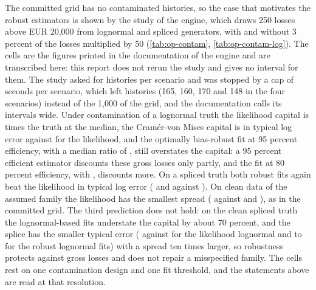 The committed grid has no contaminated histories, so the case that motivates the robust estimators is shown by the study of the engine, which draws 250 losses above EUR 20,000 from lognormal and spliced generators, with and
without 3 percent of the losses multiplied by 50 (\cref{tab:op-contam}, \cref{tab:op-contam-log}). The cells are the figures printed in the documentation of the engine and are transcribed here: this report does not rerun the study and gives no interval for them.
The study asked for \opContamRequested{} histories per scenario and was stopped by a cap of \opContamCap{} seconds per scenario, which left \opContamN{} histories (165, 160, 170 and 148 in the four scenarios) instead of the 1,000 of the grid, and the documentation calls
its intervals wide. Under contamination of a lognormal truth the likelihood capital is \opContamMleMedian{} times the truth at the median, the Cram\'er-von Mises capital
is \opContamGrossCvm{} in typical log error against \opContamGrossMle{} for the likelihood, and the optimally bias-robust fit at 95 percent efficiency, with a median ratio of \opContamObreMedian{}, still overstates the capital: a 95 percent efficient estimator discounts these gross losses only
partly, and the fit at 80 percent efficiency, with \opContamGrossObreEighty{}, discounts more. On a spliced truth both robust fits again beat the likelihood in typical log error (\opContamSplCvm{} and \opContamSplObre{} against \opContamSplMle{}). On clean data of the assumed family the likelihood has the smallest spread
(\opContamCleanIqrMle{} against \opContamCleanIqrObre{} and \opContamCleanIqrCvm{}), as in the committed grid. The third prediction does not hold: on the clean spliced truth the lognormal-based fits understate the capital by about 70 percent, and the splice has the smaller typical error
(\opContamSpliceErrSplice{} against \opContamSpliceErrMle{} for the likelihood lognormal and \opContamSpliceErrRobLo{} to \opContamSpliceErrRobHi{} for the robust lognormal fits) with a spread ten times larger, so robustness protects against gross losses and does not repair a misspecified family. The cells rest on one contamination design and one fit threshold, and the statements above are read at that resolution.




